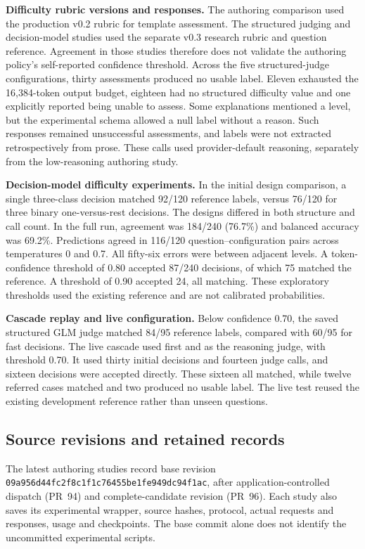\textbf{Difficulty rubric versions and responses.} The authoring comparison used the production v0.2 rubric for template assessment. The structured judging and decision-model studies used the separate v0.3 research rubric and question reference. Agreement in those studies therefore does not validate the authoring policy's self-reported confidence threshold. Across the five structured-judge configurations, thirty assessments produced no usable label. Eleven exhausted the 16,384-token output budget, eighteen had no structured difficulty value and one explicitly reported being unable to assess. Some explanations mentioned a level, but the experimental schema allowed a null label without a reason. Such responses remained unsuccessful assessments, and labels were not extracted retrospectively from prose. These calls used provider-default reasoning, separately from the low-reasoning authoring study.

\textbf{Decision-model difficulty experiments.} In the initial design comparison, a single three-class decision matched 92/120 reference labels, versus 76/120 for three binary one-versus-rest decisions. The designs differed in both structure and call count. In the full run, agreement was 184/240 (76.7\%) and balanced accuracy was 69.2\%. Predictions agreed in 116/120 question--configuration pairs across temperatures 0 and 0.7. All fifty-six errors were between adjacent levels. A token-confidence threshold of 0.80 accepted 87/240 decisions, of which 75 matched the reference. A threshold of 0.90 accepted 24, all matching. These exploratory thresholds used the existing reference and are not calibrated probabilities.

\textbf{Cascade replay and live configuration.} Below confidence 0.70, the saved structured GLM judge matched 84/95 reference labels, compared with 60/95 for fast decisions. The live cascade used  first and  as the reasoning judge, with threshold 0.70. It used thirty initial decisions and fourteen judge calls, and sixteen decisions were accepted directly. These sixteen all matched, while twelve referred cases matched and two produced no usable label. The live test reused the existing development reference rather than unseen questions.

\subsection{Source revisions and retained records}

The latest authoring studies record base revision \nolinkurl{09a956d44fc2f8c1f1c76455be1fe949dc94f1ac}, after application-controlled dispatch (PR~94) and complete-candidate revision (PR~96). Each study also saves its experimental wrapper, source hashes, protocol, actual requests and responses, usage and checkpoints. The base commit alone does not identify the uncommitted experimental scripts.


